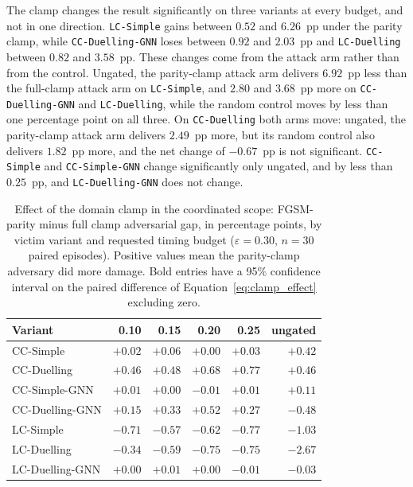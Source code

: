 The clamp changes the result significantly on three variants at every budget, and not
in one direction. \texttt{LC-Simple} gains between $0.52$ and $6.26$~pp under the parity
clamp, while \texttt{CC-Duelling-GNN} loses between $0.92$ and $2.03$~pp and
\texttt{LC-Duelling} between $0.82$ and $3.58$~pp. These changes come from the attack
arm rather than from the control. Ungated, the parity-clamp attack arm delivers
$6.92$~pp less than the full-clamp attack arm on \texttt{LC-Simple}, and $2.80$ and
$3.68$~pp more on \texttt{CC-Duelling-GNN} and \texttt{LC-Duelling}, while the random
control moves by less than one percentage point on all three. On \texttt{CC-Duelling}
both arms move: ungated, the parity-clamp attack arm delivers $2.49$~pp more, but its
random control also delivers $1.82$~pp more, and the net change of $-0.67$~pp is not
significant. \texttt{CC-Simple} and \texttt{CC-Simple-GNN} change significantly only
ungated, and by less than $0.25$~pp, and \texttt{LC-Duelling-GNN} does not change.

\begin{table}[htbp]
  \centering
  \caption{Effect of the domain clamp in the coordinated scope: FGSM-parity minus full
           clamp adversarial gap, in percentage points, by victim variant and requested
           timing budget ($\varepsilon = 0.30$, $n = 30$ paired episodes). Positive
           values mean the parity-clamp adversary did more damage. Bold entries have a
           95\% confidence interval on the paired difference of
           Equation~\eqref{eq:clamp_effect} excluding zero.}
  \label{tab:clamp_effect_coordinated}
  \begin{tabular}{lrrrrr}
    \hline
    \textbf{Variant} & \textbf{0.10} & \textbf{0.15} & \textbf{0.20} & \textbf{0.25} & \textbf{ungated} \\
    \hline
    CC-Simple        & $+0.02$ & $+0.06$ & $+0.00$ & $+0.03$ & $\mathbf{+0.42}$ \\
    CC-Duelling      & $\mathbf{+0.46}$ & $\mathbf{+0.48}$ & $\mathbf{+0.68}$ & $\mathbf{+0.77}$ & $+0.46$ \\
    CC-Simple-GNN    & $+0.01$ & $+0.00$ & $-0.01$ & $+0.01$ & $+0.11$ \\
    CC-Duelling-GNN  & $+0.15$ & $+0.33$ & $+0.52$ & $+0.27$ & $-0.48$ \\
    LC-Simple        & $\mathbf{-0.71}$ & $-0.57$ & $\mathbf{-0.62}$ & $\mathbf{-0.77}$ & $-1.03$ \\
    LC-Duelling      & $\mathbf{-0.34}$ & $\mathbf{-0.59}$ & $\mathbf{-0.75}$ & $\mathbf{-0.75}$ & $\mathbf{-2.67}$ \\
    LC-Duelling-GNN  & $+0.00$ & $+0.01$ & $+0.00$ & $-0.01$ & $-0.03$ \\
    \hline
  \end{tabular}
\end{table}

